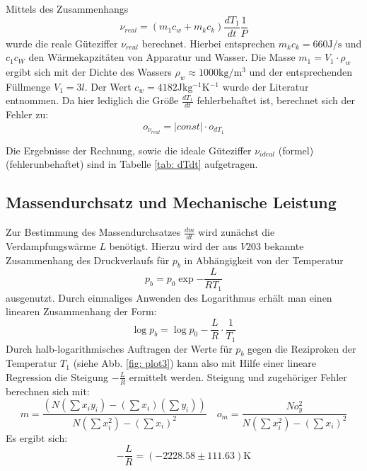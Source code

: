 Mittels des Zusammenhangs
\begin{equation}
  \nu_{real} = (m_1 c_w + m_k c_k) \frac{dT_1}{dt} \frac{1}{P} %
\end{equation}
wurde die reale Güteziffer $\nu_{real}$ berechnet. Hierbei entsprechen $m_k c_k = 660 \si{\joule \per \second}$ und $c_1 c_W$ den Wärmekapzitäten von Apparatur und Wasser. Die Masse $m_1 = V_1 \cdot \rho_w$ ergibt sich mit
der Dichte des Wassers $\rho_w \approx 1000 \si{\kilo \gram \per \meter ^3}$  und der entsprechenden Füllmenge $V_1 = 3 l$. Der Wert $c_w = 4182\si{\joule \kilo \gram^{-1} \kelvin^{-1}}$ wurde der Literatur \cite{demtröder} entnommen. %
Da hier lediglich die Größe $\frac{dT_1}{dt}$ fehlerbehaftet ist, berechnet sich der Fehler zu: %
\begin{equation}
  o_{\nu_{real}} = \left| const \right| \cdot o_{dT_1} %
  \label{eq: errorconst}
\end{equation}

Die Ergebnisse der Rechnung, sowie die ideale Güteziffer $\nu_{ideal}$ (formel) (fehlerunbehaftet) sind in Tabelle \ref{tab: dTdt} aufgetragen.


\subsection{Massendurchsatz und Mechanische Leistung}
Zur Bestimmung des Massendurchsatzes $\frac{dm}{dt}$ wird zunächst die Verdampfungswärme $L$ benötigt. Hierzu wird der aus $V203$ \cite{anleitung203} bekannte Zusammenhang des Druckverlaufs für $p_b$ in Abhängigkeit von der Temperatur%
\begin{equation}
  p_b = p_0 \exp{-\frac{L}{R T_1}} %
\end{equation}
ausgenutzt. Durch einmaliges Anwenden des Logarithmus erhält man einen linearen Zusammenhang der Form:
\begin{equation}
  \log{p_b} = \log{p_0} -\frac{L}{R} \cdot \frac{1}{T_1} 
\end{equation}
Durch halb-logarithmisches Auftragen der Werte für $p_b$ gegen die Reziproken der Temperatur $T_1$ (siehe Abb. \ref{fig: plot3}) kann also mit Hilfe einer lineare Regression die Steigung $-\frac{L}{R}$ ermittelt werden.
Steigung und zugehöriger Fehler berechnen sich mit:
\begin{equation}
  m= \frac{\left( N  (\sum x_i y_i) - (\sum x_i)(\sum y_i)\right)}{N (\sum x_i^2)- (\sum x_i)^2 }    \quad   o_m=\frac{N o_y^2}{N (\sum x_i^2)- (\sum x_i)^2 }
\end{equation}
Es ergibt sich:
\begin{equation}
  -\frac{L}{R} =  (-2228.58 \pm 111.63) \si{\kelvin}
\end{equation}

